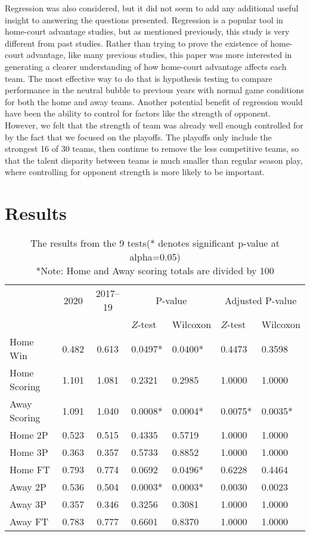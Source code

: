 \documentclass[10pt]{article}
\begin{document}
Regression was also considered, but it did not seem to add any additional 
useful insight to answering the questions presented. Regression is a popular
tool in home-court advantage studies, but as mentioned previously, this
study is very different from past studies. Rather than trying to prove the
existence of home-court advantage, like many previous studies, this paper
was more interested in generating a clearer understanding of how home-court
advantage affects each team. The most effective way to do that is hypothesis
testing to compare performance in the neutral bubble to previous years with
normal game conditions for both the home and away teams. Another potential
benefit of regression would have been the ability to control for factors
like the strength of opponent. However, we felt that the strength of team was
already well enough controlled for by the fact that we focused on the
playoffs. The playoffs only include the strongest 16 of 30 teams, then
continue to remove the less competitive teams, so that the talent disparity
between teams is much smaller than regular season play, where controlling for
opponent strength is more likely to be important.

\section{Results}

\begin{table}[tbp]
  \caption{The results from the 9 tests(* denotes significant p-value at alpha=0.05)
  \\*Note: Home and Away scoring totals are divided by 100}
  \label{tab:table}
\centering
\begin{tabular}[t]{lccllll}
  \toprule
  & 2020 & 2017--19 & \multicolumn{2}{c}{P-value} & \multicolumn{2}{c}{Adjusted P-value}\\
\cmidrule(lr){4-5}\cmidrule(lr){6-7}
  &          &                & \(Z\)-test & Wilcoxon & \(Z\)-test & Wilcoxon\\
  \midrule
  Home Win & 0.482 & 0.613 & 0.0497* & 0.0400* & 0.4473 & 0.3598\\
  \midrule
Home Scoring & 1.101 & 1.081 & 0.2321 & 0.2985 & 1.0000 & 1.0000\\
\midrule
Away Scoring & 1.091 & 1.040 & 0.0008* & 0.0004* & 0.0075* & 0.0035*\\
\midrule
Home 2P & 0.523 & 0.515 & 0.4335 & 0.5719 & 1.0000 & 1.0000\\
\midrule
Home 3P & 0.363 & 0.357 & 0.5733 & 0.8852 & 1.0000 & 1.0000\\
\midrule
Home FT & 0.793 & 0.774 & 0.0692 & 0.0496* & 0.6228 & 0.4464\\
\midrule
Away 2P & 0.536 & 0.504 & 0.0003* & 0.0003* & 0.0030 & 0.0023\\
\midrule
Away 3P & 0.357 & 0.346 & 0.3256 & 0.3081 & 1.0000 & 1.0000\\
\midrule
Away FT & 0.783 & 0.777 & 0.6601 & 0.8370 & 1.0000 & 1.0000\\
  \bottomrule
\end{tabular}
\end{table}
\end{document}
